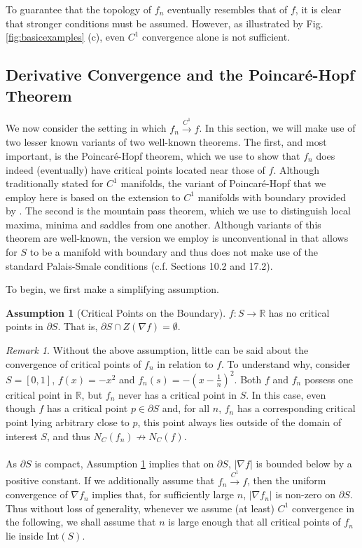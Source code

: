 \documentclass[11pt]{article}
\newcommand{\1}{\mathbf{1}}
\theoremstyle{definition}
\newtheorem{assumption}{Assumption}%
\theoremstyle{remark}
\newtheorem*{remark}{Remark}
\begin{document}
To guarantee that the topology of $f_n$ eventually resembles that of $f$, it is clear that stronger conditions must be assumed. However, as illustrated by Fig. \ref{fig:basicexamples} (c), even $C^1$ convergence alone is not sufficient.

\subsection{Derivative Convergence and the Poincar\'{e}-Hopf Theorem}\label{sec:homology}

We now consider the setting in which $f_n\xrightarrow{C^1}f$. In this section, we will make use of two lesser known variants of two well-known theorems. The first, and most important, is the Poincar\'{e}-Hopf theorem, which we use to show that $f_n$ does indeed (eventually) have critical points located near those of $f$. Although traditionally stated for $C^1$ manifolds, the variant of Poincar\'{e}-Hopf that we employ here is based on the extension to $C^1$ manifolds with boundary provided by \cite{jubin2009generalized}. The second is the mountain pass theorem, which we use to distinguish local maxima, minima and saddles from one another. Although variants of this theorem are well-known, the version we employ is unconventional in that allows for $S$ to be a manifold with boundary and thus does not make use of the standard Palais-Smale conditions (c.f. \cite{Jabri_2003} Sections 10.2 and 17.2).

To begin, we first make a simplifying assumption.
\begin{examplebox}
\begin{assumption}[Critical Points on the Boundary]\label{assump:no_bdry_crits} $f:S\rightarrow \mathbb{R}$ has no critical points in $\partial S$. That is, $\partial S \cap Z(\nabla f) = \emptyset$.
    \vspace{0.3cm}
\end{assumption}
\end{examplebox}
\begin{remark}
    Without the above assumption, little can be said about the convergence of critical points of $f_n$ in relation to $f$. To understand why, consider $S=[0,1]$, $f(x)=-x^2$ and $f_n(s)=-(x-\frac{1}{n})^2$. Both $f$ and $f_n$ possess one critical point in $\mathbb{R}$, but $f_n$ never has a critical point in $S$. In this case, even though $f$ has a critical point $p \in \partial S$ and, for all $n$, $f_n$ has a corresponding critical point lying arbitrary close to $p$, this point always lies outside of the domain of interest $S$, and thus $N_C(f_n)\not\rightarrow N_C(f)$.\\
\\
  \noindent As $\partial S$ is compact, Assumption \ref{assump:no_bdry_crits} implies that on $\partial S$, $|\nabla f|$ is bounded below by a positive constant. If we additionally assume that $f_n\xrightarrow{C^1} f$, then the uniform convergence of $\nabla f_n$ implies that, for sufficiently large $n$, $|\nabla f_n|$ is non-zero on $\partial S$. Thus without loss of generality, whenever we assume (at least) $C^1$ convergence in the following, we shall assume that $n$ is large enough that all critical points of $f_n$ lie inside Int$(S)$.
\end{remark}
\end{document}
